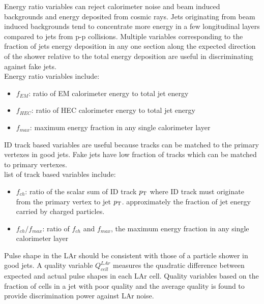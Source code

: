 \indent Energy ratio variables can reject calorimeter noise and beam induced backgrounds and energy deposited from cosmic rays.  Jets originating from beam induced backgrounds tend to concentrate more energy in a few longitudinal layers compared to jets from p-p collisions.  Multiple variables corresponding to the fraction of jets energy deposition in any one section along the expected direction of the shower relative to the total energy deposition are useful in discriminating against fake jets. \\

\indent Energy ratio variables include: \\

\begin{itemize}
\item[] $f_{EM}$: ratio of EM calorimeter energy to total jet energy
\item[] $f_{HEC}$: ratio of HEC calorimeter energy to total jet energy
\item[] $f_{max}$: maximum energy fraction in any single calorimeter layer
\end{itemize}

\indent ID track based variables are useful because tracks can be matched to the primary vertexes in good jets.  Fake jets have low fraction of tracks which can be matched to primary vertexes.  \\

\indent list of track based variables include: \\

\begin{itemize}
\item[] $f_{ch}$: ratio of the scalar sum of ID track $p_{\mathrm{T}}$ where ID track must originate from the primary vertex to jet $p_{\mathrm{T}}$.  approximately the fraction of jet energy carried by charged particles.  
\item[] $f_{ch}/f_{max}$: ratio of $f_{ch}$ and $f_{max}$, the maximum energy fraction in any single calorimeter layer
\end{itemize}

\indent Pulse shape in the LAr should be consistent with those of a particle shower in good jets.  A quality variable $Q^{LAr}_{cell}$ measures the quadratic difference between expected and actual pulse shapes in each LAr cell.  Quality variables based on the fraction of cells in a jet with poor quality and the average quality is found to provide discrimination power against LAr noise. \\

